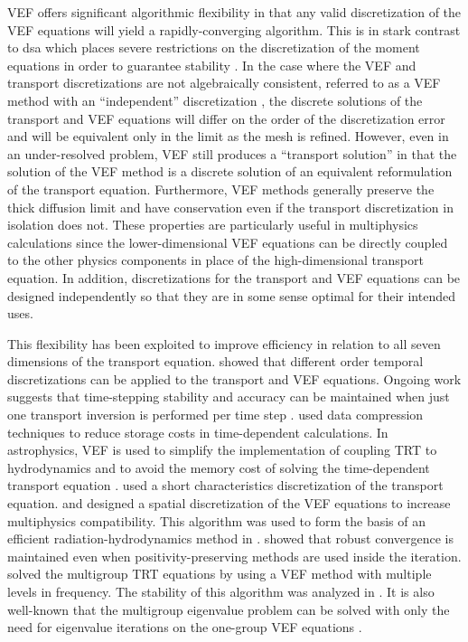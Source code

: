 \documentclass[../doc.tex]{subfiles}
\begin{document}
VEF offers significant algorithmic flexibility in that any valid discretization of the VEF equations will yield a rapidly-converging algorithm. This is in stark contrast to \gls{dsa} which places severe restrictions on the discretization of the moment equations in order to guarantee stability \cite{A}. In the case where the VEF and transport discretizations are not algebraically consistent, referred to as a VEF method with an ``independent'' discretization \cite{doi:10.1080/00411459308203810,two-level-independent-warsa}, the discrete solutions of the transport and VEF equations will differ on the order of the discretization error and will be equivalent only in the limit as the mesh is refined. However, even in an under-resolved problem, VEF still produces a ``transport solution'' in that the solution of the VEF method is a discrete solution of an equivalent reformulation of the transport equation. Furthermore, VEF methods generally preserve the thick diffusion limit \cite{diflim} and have conservation even if the transport discretization in isolation does not. These properties are particularly useful in multiphysics calculations since the lower-dimensional VEF equations can be directly coupled to the other physics components in place of the high-dimensional transport equation. In addition, discretizations for the transport and VEF equations can be designed independently so that they are in some sense optimal for their intended uses. 

This flexibility has been exploited to improve efficiency in relation to all seven dimensions of the transport equation. 
\textcite{GHASSEMI2020109315} showed that different order temporal discretizations can be applied to the transport and VEF equations. Ongoing work suggests that time-stepping stability and accuracy can be maintained when just one transport inversion is performed per time step \cite{yee_mc21}. \textcite{anistratov2021implicit} used data compression techniques to reduce storage costs in time-dependent calculations. In astrophysics, VEF is used to simplify the implementation of coupling TRT to hydrodynamics and to avoid the memory cost of solving the time-dependent transport equation \cite{Jiang_2012,GNEDIN2001437,GEHMEYR1994320}. 
\textcite{Davis_2012} used a short characteristics discretization of the transport equation. \textcite{me} and \textcite{LOU2019258} designed a spatial discretization of the VEF equations to increase multiphysics compatibility. This algorithm was used to form the basis of an efficient radiation-hydrodynamics method in \cite{LOU2021110393}. \textcite{YEE2020109696} showed that robust convergence is maintained even when positivity-preserving methods are used inside the iteration. 
\textcite{anistratov2020nonlinear} solved the multigroup TRT equations by using a VEF method with multiple levels in frequency. The stability of this algorithm was analyzed in \cite{ANISTRATOV2019186}. It is also well-known that the multigroup eigenvalue problem can be solved with only the need for eigenvalue iterations on the one-group VEF equations \cite{AL}. 
\end{document}
